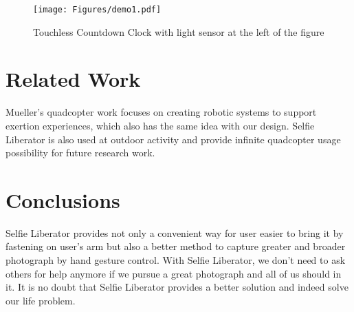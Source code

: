 \documentclass{sig-alternate-ipsn13}
\begin{document}
\begin{figure}
  \centering
  \texttt{[image: Figures/demo1.pdf]}
  \caption{Touchless Countdown Clock with light sensor at the left of the figure}
  \label{fig:demo1}
\end{figure}

\section{Related Work}
Mueller's quadcopter work\cite{cite1} focuses on creating robotic systems to support exertion experiences, which also has the same idea with our design. Selfie Liberator is also used at outdoor activity and provide infinite quadcopter usage possibility for future research work.



\section{Conclusions}
Selfie Liberator provides not only a convenient way for user easier to bring it by fastening on user's arm but also a better method to capture greater and broader photograph by hand gesture control. With Selfie Liberator, we don't need to ask others for help anymore if we pursue a great photograph and all of us should in it. It is no doubt that Selfie Liberator provides a better solution and indeed solve our life problem. 
\end{document}
